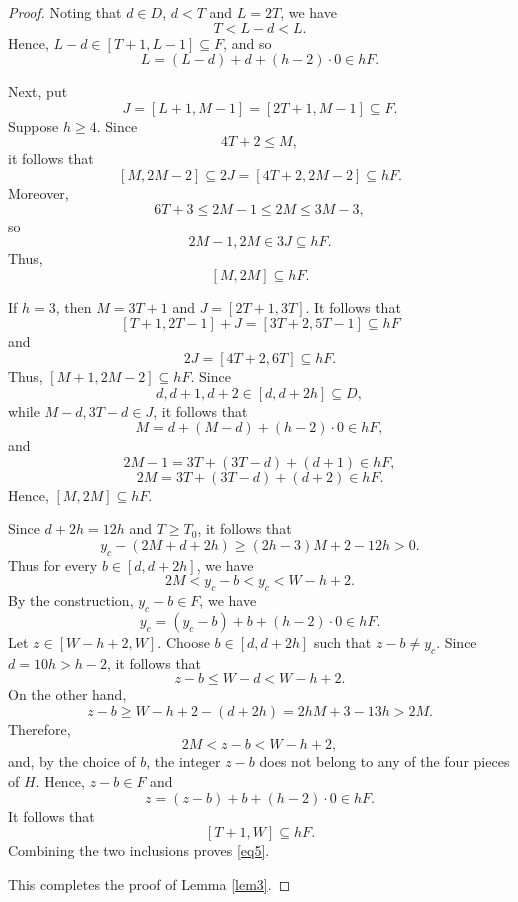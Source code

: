 \documentclass[10pt,a4paper]{amsart}
\begin{document}
\begin{proof}
Noting that $d\in D$, $d<T$ and $L=2T$, we have
\[
 T<L-d<L.
\]
Hence, $L-d\in[T+1,L-1]\subseteq F$, and so
\[
 L=(L-d)+d+(h-2)\cdot0\in hF.
\]

Next, put
\[
 J=[L+1,M-1]=[2T+1,M-1]\subseteq F.
\]
Suppose $h\ge4$. Since
\[
 4T+2\le M,
\]
it follows that
\[
 [M,2M-2]\subseteq2J=[4T+2,2M-2]\subseteq hF.
\]
Moreover,
\[
 6T+3\le2M-1\le2M\le3M-3,
\]
so
\[
 2M-1,2M\in3J\subseteq hF.
\]
Thus,
\[
 [M,2M]\subseteq hF.
\]


If $h=3$, then $M=3T+1$ and $J=[2T+1,3T]$. It follows that
\[
 [T+1,2T-1]+J=[3T+2,5T-1]\subseteq hF
\]
and
\[
 2J=[4T+2,6T]\subseteq hF.
\]
Thus, $[M+1,2M-2]\subseteq hF$. Since 
\[
 d,d+1,d+2\in[d,d+2h]\subseteq D,
\]
while $M-d,3T-d\in J$, it follows that
\[
 M=d+(M-d)+(h-2)\cdot0\in hF,
\]
and
\[
 2M-1=3T+(3T-d)+(d+1)\in hF,
\]
\[
 2M=3T+(3T-d)+(d+2)\in hF.
\]
Hence, $[M,2M]\subseteq hF$.

Since $d+2h=12h$ and $T\ge T_0$, it follows that
\[
 y_c-(2M+d+2h)\ge(2h-3)M+2-12h>0.
\]
Thus for every $b\in[d,d+2h]$, we have
\[
 2M<y_c-b<y_c<W-h+2.
\]
By the construction, $y_c-b\in F$, we have
\[
 y_c=(y_c-b)+b+(h-2)\cdot0\in hF.
\]
Let $z\in[W-h+2,W]$. Choose $b\in[d,d+2h]$ such that $z-b\ne y_c$. Since $d=10h>h-2$, it follows that
\[
 z-b\le W-d<W-h+2.
\]
On the other hand,
\[
 z-b\ge W-h+2-(d+2h)=2hM+3-13h>2M.
\]
Therefore,
\[
 2M<z-b<W-h+2,
\]
and, by the choice of $b$, the integer $z-b$ does not belong to any of the four pieces of $H$. Hence, $z-b\in F$ and
\[
 z=(z-b)+b+(h-2)\cdot0\in hF.
\]
It follows that
\[
 [T+1,W]\subseteq hF.
\]
Combining the two inclusions proves \eqref{eq5}. 

This completes the proof of Lemma \ref{lem3}.
\end{proof}
\end{document}
